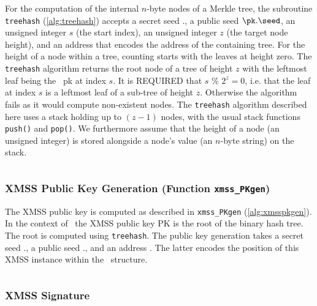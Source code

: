 For the computation of the internal $n$-byte nodes of a Merkle tree, the subroutine \texttt{treehash} (\cref{alg:treehash}) accepts a secret seed \sk.\seed, a public seed $\pk.\seed$, an unsigned integer $s$ (the start index), an unsigned integer $z$ (the target node height), and an address \ADRS that encodes the address of the containing tree. For the height of a node within a tree, counting starts with the leaves at height zero. The \texttt{treehash} algorithm returns the root node of a tree of height $z$ with the leftmost leaf being the \WOTSCS\ pk at index $s$. It is REQUIRED that $s$ \% $2^{z}=0$, i.e. that the leaf at index $s$ is a leftmost leaf of a sub-tree of height $z$. Otherwise the algorithm fails as it would compute non-existent nodes. The \texttt{treehash} algorithm described here uses a stack holding up to $(z-1)$ nodes, with the usual stack functions \texttt{push()} and \texttt{pop()}. We furthermore assume that the height of a node (an unsigned integer) is stored alongside a node's value (an $n$-byte string) on the stack.

\begin{algorithm}
\inputminted[breaklines,linenos,tabsize=2,mathescape,escapeinside=||]{C}{code/treehash.cs}
\caption{\texttt{treehash} --- The TreeHash algorithm.}
\label{alg:treehash}
\end{algorithm}

\subsubsection{XMSS Public Key Generation (Function \texttt{xmss\_PKgen})}

The XMSS public key is computed as described in \texttt{xmss\_PKgen} (\cref{alg:xmsspkgen}). In the context of \SPHINCSA\ the XMSS public key PK is the root of the binary hash tree. The root is computed using \texttt{treehash}. The public key generation takes a secret seed \sk.\seed, a public seed \pk.\seed, and an address \ADRS. The latter encodes the position of this XMSS instance within the \SPHINCSA\ structure.

\begin{algorithm}
    \inputminted[breaklines,linenos,tabsize=2,mathescape,escapeinside=||]{C}{code/xmss_PKgen.cs}
    \caption{\texttt{xmss\_PKgen} --- Generating an XMSS public key.}
    \label{alg:xmsspkgen}
\end{algorithm}

\subsubsection{XMSS Signature}

